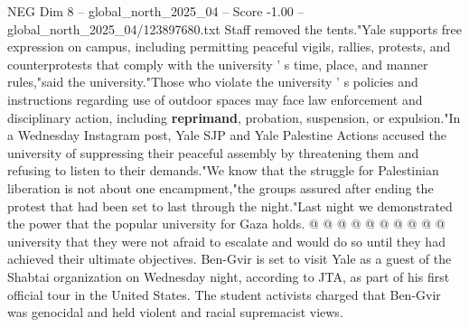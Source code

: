 \begin{textsample}{NEG Dim 8 – global\_north\_2025\_04 – Score -1.00 – global\_north\_2025\_04/123897680.txt}
Staff removed the tents."Yale supports free expression on campus, including permitting peaceful vigils, rallies, protests, and counterprotests that comply with the university ' s time, place, and manner rules,"said the university."Those who violate the university ' s policies and instructions regarding use of outdoor spaces may face law enforcement and disciplinary action, including \textbf{reprimand}, probation, suspension, or expulsion."In a Wednesday Instagram post, Yale SJP and Yale Palestine Actions accused the university of suppressing their peaceful assembly by threatening them and refusing to listen to their demands."We know that the struggle for Palestinian liberation is not about one encampment,"the groups assured after ending the protest that had been set to last through the night."Last night we demonstrated the power that the popular university for Gaza holds. @ @ @ @ @ @ @ @ @ @ university that they were not afraid to escalate and would do so until they had achieved their ultimate objectives.
Ben-Gvir is set to visit Yale as a guest of the Shabtai organization on Wednesday night, according to JTA, as part of his first official tour in the United States.
The student activists charged that Ben-Gvir was genocidal and held violent and racial supremacist views.

\end{textsample}
